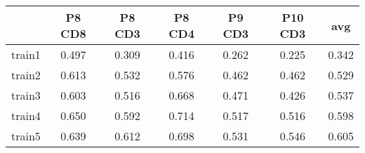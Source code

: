\begin{tabular}{lcccccc}
   \hline  &P8 CD8& P8 CD3& P8 CD4& P9 CD3& P10 CD3& avg\\ 
\hline
train1 & 0.497 & 0.309 & 0.416 & 0.262 & 0.225 & 0.342 \\ 
  train2 & 0.613 & 0.532 & 0.576 & 0.462 & 0.462 & 0.529 \\ 
  train3 & 0.603 & 0.516 & 0.668 & 0.471 & 0.426 & 0.537 \\ 
  train4 & 0.650 & 0.592 & 0.714 & 0.517 & 0.516 & 0.598 \\ 
  train5 & 0.639 & 0.612 & 0.698 & 0.531 & 0.546 & 0.605 \\ 
   \hline
\end{tabular}
